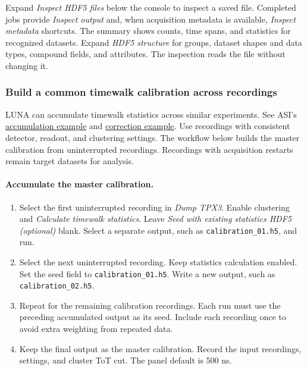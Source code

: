 \documentclass[11pt,a4paper]{article}
\newcommand{\code}[1]{\texttt{#1}}
\begin{document}
Expand \emph{Inspect HDF5 files} below the console to inspect a saved file.
Completed jobs provide \emph{Inspect output} and, when acquisition metadata
is available, \emph{Inspect metadata} shortcuts. The
summary shows counts, time spans, and statistics for recognized datasets.
Expand \emph{HDF5 structure} for groups, dataset shapes and data types,
compound fields, and attributes. The inspection reads the file without
changing it.

\subsubsection{Build a common timewalk calibration across recordings}
\label{sec:timewalk-accumulation}

LUNA can accumulate timewalk statistics across similar experiments.
See ASI's \href{https://amsterdam-scientific-instruments.github.io/luna-docs/3_examples/ex15_accumulate_timewalk_statistics.html}{accumulation example}
and \href{https://amsterdam-scientific-instruments.github.io/luna-docs/3_examples/ex14_apply_timewalk_correction.html}{correction example}.
Use recordings with consistent detector, readout, and clustering settings.
The workflow below builds the master calibration from uninterrupted recordings.
Recordings with acquisition restarts remain target datasets for analysis.

\paragraph{Accumulate the master calibration.}
\begin{enumerate}[leftmargin=*]
  \item Select the first uninterrupted recording in \emph{Dump TPX3}.
        Enable clustering and \emph{Calculate timewalk statistics}.
        Leave \emph{Seed with existing statistics HDF5 (optional)} blank.
        Select a separate output, such as \code{calibration\_01.h5}, and run.
  \item Select the next uninterrupted recording. Keep statistics calculation
        enabled. Set the seed field to \code{calibration\_01.h5}.
        Write a new output, such as \code{calibration\_02.h5}.
  \item Repeat for the remaining calibration recordings. Each run must use
        the preceding accumulated output as its seed. Include each recording
        once to avoid extra weighting from repeated data.
  \item Keep the final output as the master calibration. Record the input
        recordings, settings, and cluster ToT cut. The panel default is 500 ns.
\end{enumerate}
\end{document}
